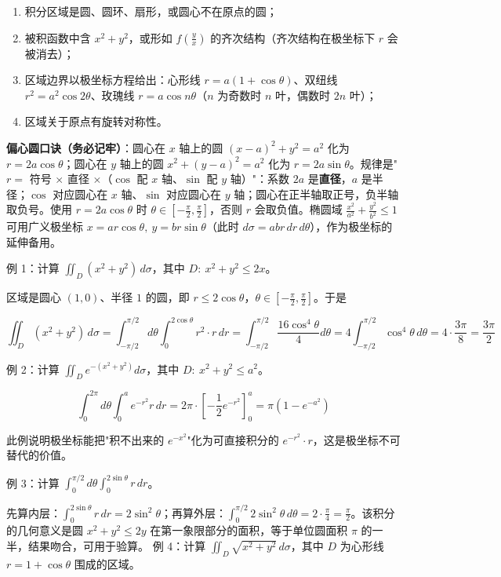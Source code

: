 \documentclass[11pt,openany,UTF8]{ctexbook}
\begin{document}
\begin{enumerate}
\item 积分区域是圆、圆环、扇形，或圆心不在原点的圆；
\item 被积函数中含 $x^{2}+y^{2}$，或形如 $f\left(\frac yx\right)$ 的齐次结构（齐次结构在极坐标下 $r$ 会被消去）；
\item 区域边界以极坐标方程给出：心形线 $r=a(1+\cos\theta)$、双纽线 $r^{2}=a^{2}\cos 2\theta$、玫瑰线 $r=a\cos n\theta$（$n$ 为奇数时 $n$ 叶，偶数时 $2n$ 叶）；
\item 区域关于原点有旋转对称性。
\end{enumerate}
\textbf{偏心圆口诀（务必记牢）}：圆心在 $x$ 轴上的圆 $(x-a)^{2}+y^{2}=a^{2}$ 化为 $r=2a\cos\theta$；圆心在 $y$ 轴上的圆 $x^{2}+(y-a)^{2}=a^{2}$ 化为 $r=2a\sin\theta$。规律是"$r=$ 符号 $\times$ 直径 $\times$（$\cos$ 配 $x$ 轴、$\sin$ 配 $y$ 轴）"：系数 $2a$ 是\textbf{直径}，$a$ 是半径；$\cos$ 对应圆心在 $x$ 轴、$\sin$ 对应圆心在 $y$ 轴；圆心在正半轴取正号，负半轴取负号。使用 $r=2a\cos\theta$ 时 $\theta\in\left[-\frac{\pi}{2},\frac{\pi}{2}\right]$，否则 $r$ 会取负值。椭圆域 $\frac{x^{2}}{a^{2}}+\frac{y^{2}}{b^{2}}\le 1$ 可用广义极坐标 $x=ar\cos\theta,\ y=br\sin\theta$（此时 $d\sigma=abr\,dr\,d\theta$），作为极坐标的延伸备用。

例 1：计算 $\iint_{D}(x^{2}+y^{2})\,d\sigma$，其中 $D:\ x^{2}+y^{2}\le 2x$。

区域是圆心 $(1,0)$、半径 $1$ 的圆，即 $r\le 2\cos\theta$，$\theta\in\left[-\frac{\pi}{2},\frac{\pi}{2}\right]$。于是

\[\iint_{D}(x^{2}+y^{2})\,d\sigma=\int_{-\pi/2}^{\pi/2}d\theta\int_{0}^{2\cos\theta}r^{2}\cdot r\,dr=\int_{-\pi/2}^{\pi/2}\frac{16\cos^{4}\theta}{4}d\theta=4\int_{-\pi/2}^{\pi/2}\cos^{4}\theta\,d\theta=4\cdot\frac{3\pi}{8}=\frac{3\pi}{2}\]

例 2：计算 $\iint_{D}e^{-(x^{2}+y^{2})}d\sigma$，其中 $D:\ x^{2}+y^{2}\le a^{2}$。

\[\int_{0}^{2\pi}d\theta\int_{0}^{a}e^{-r^{2}}r\,dr=2\pi\cdot\left[-\frac12e^{-r^{2}}\right]_{0}^{a}=\pi\left(1-e^{-a^{2}}\right)\]

此例说明极坐标能把"积不出来的 $e^{-x^{2}}$"化为可直接积分的 $e^{-r^{2}}\cdot r$，这是极坐标不可替代的价值。

例 3：计算 $\displaystyle\int_{0}^{\pi/2}d\theta\int_{0}^{2\sin\theta}r\,dr$。

先算内层：$\int_{0}^{2\sin\theta}r\,dr=2\sin^{2}\theta$；再算外层：$\int_{0}^{\pi/2}2\sin^{2}\theta\,d\theta=2\cdot\frac{\pi}{4}=\frac{\pi}{2}$。该积分的几何意义是圆 $x^{2}+y^{2}\le 2y$ 在第一象限部分的面积，等于单位圆面积 $\pi$ 的一半，结果吻合，可用于验算。 例 4：计算 $\displaystyle\iint_{D}\sqrt{x^{2}+y^{2}}\,d\sigma$，其中 $D$ 为心形线 $r=1+\cos\theta$ 围成的区域。
\end{document}
